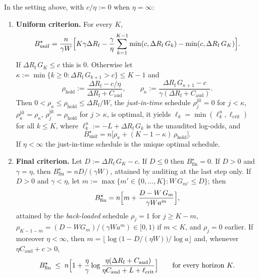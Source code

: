 \begin{theorem}
\label{thm:audit-deterrence}
In the setting above, with $c/\eta:=0$ when $\eta=\infty$:
\begin{enumerate}
\item[\textup{(i)}] \textbf{Uniform criterion.} For every $K$,
\begin{equation}\label{eq:audit-unif-id}
  B^\star_{\mathrm{unif}}=\frac{n}{\gamma W}\Bigl[K\gamma\Delta R_{\mathrm f}
   -\frac{\gamma}{\eta}\sum_{k=1}^{K-1}\min(c,\Delta R_{\mathrm f}\,G_k)-\min(c,\Delta R_{\mathrm f}\,G_K)\Bigr].
\end{equation}
If $\Delta R_{\mathrm f}\,G_K\le c$ this is $0$. Otherwise let
$\kappa:=\min\{k\ge0:\Delta R_{\mathrm f}\,G_{k+1}>c\}\le K-1$ and
\[
  \rho_{\mathrm{hold}}:=\frac{\Delta R_{\mathrm f}-c/\eta}{\Delta R_{\mathrm f}+C_{\mathrm{aud}}},\qquad
  \rho_\kappa:=\frac{\Delta R_{\mathrm f}\,G_{\kappa+1}-c}{\gamma(\Delta R_{\mathrm f}+C_{\mathrm{aud}})} .
\]
Then $0<\rho_\kappa\le\rho_{\mathrm{hold}}\le\Delta R_{\mathrm f}/W$, the
\emph{just-in-time} schedule
$\rho^{\mathrm{jit}}_j=0$ for $j<\kappa$, $\rho^{\mathrm{jit}}_\kappa=\rho_\kappa$,
$\rho^{\mathrm{jit}}_j=\rho_{\mathrm{hold}}$ for $j>\kappa$, is optimal, it yields
$\ell_k=\min(\ell^{u}_k,\ell_{\mathrm{crit}})$ for all $k\le K$, where $\ell^{u}_k:=-L+\Delta R_{\mathrm f}\,G_k$ is the unaudited log-odds, and
\begin{equation}\label{eq:audit-unif}
  B^\star_{\mathrm{unif}}=n\bigl[\rho_\kappa+(K-1-\kappa)\,\rho_{\mathrm{hold}}\bigr].
\end{equation}
If $\eta<\infty$ the just-in-time schedule is the unique optimal schedule.
\item[\textup{(ii)}] \textbf{Final criterion.} Let $D:=\Delta R_{\mathrm f}\,G_K-c$. If
$D\le0$ then $B^\star_{\mathrm{fin}}=0$. If $D>0$ and $\gamma=\eta$, then
$B^\star_{\mathrm{fin}}=nD/(\gamma W)$, attained by auditing at the last step
only. If $D>0$ and $\gamma<\eta$, let
$m:=\max\{m'\in\{0,\dots,K\}: W\,G_{m'}\le D\}$; then
\begin{equation}\label{eq:audit-fin}
  B^\star_{\mathrm{fin}}=n\Bigl[m+\frac{D-W\,G_m}{\gamma W a^{m}}\Bigr],
\end{equation}
attained by the \emph{back-loaded} schedule $\rho_j=1$ for $j\ge K-m$,
$\rho_{K-1-m}=(D-WG_m)/(\gamma Wa^m)\in[0,1)$ if $m<K$, and $\rho_j=0$ earlier.
If moreover $\eta<\infty$, then
$m=\bigl\lfloor \log\bigl(1-D/(\eta W)\bigr)/\log a\bigr\rfloor$ and, whenever
$\eta C_{\mathrm{aud}}+c>0$,
\begin{equation}\label{eq:audit-fin-bound}
  B^\star_{\mathrm{fin}}\;\le\; n\Bigl[1+\frac{\eta}{\gamma}
  \log\frac{\eta(\Delta R_{\mathrm f}+C_{\mathrm{aud}})}{\eta C_{\mathrm{aud}}+L+\ell_{\mathrm{crit}}}\Bigr]
  \qquad\text{for every horizon }K .
\end{equation}
\end{enumerate}
\end{theorem}

